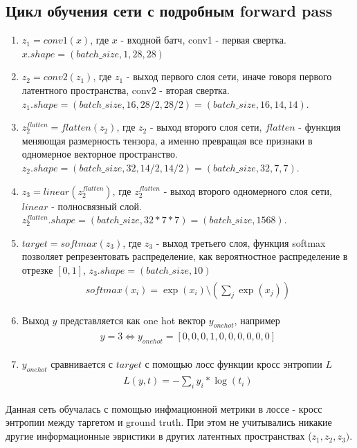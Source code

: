\subsection{Цикл обучения сети с подробным forward pass}
\begin{enumerate}
    \item $z_1 = conv1(x)$, где $x$ - входной батч, conv1 - первая свертка. $x.shape = (batch\_size, 1, 28, 28)$
    \item $z_2 = conv2(z_1)$, где $z_1$ - выход первого слоя сети, иначе говоря первого латентного пространства, conv2 - вторая свертка. $z_1.shape = (batch\_size, 16, 28 / 2, 28 / 2)  = (batch\_size, 16, 14, 14)$.
    \item $z_2^{flatten} = flatten(z_2)$, где $z_2$ - выход второго слоя сети, $flatten$ - функция меняющая размерность тензора, а именно превращая все признаки в одномерное векторное пространство. $z_2.shape = (batch\_size, 32, 14 / 2, 14 / 2) = (batch\_size, 32, 7, 7)$.
    \item $z_3 = linear(z_2^{flatten})$, где $z_2^{flatten}$ - выход второго одномерного слоя сети, $linear$ - полносвязный слой. $z_2^{flatten}.shape = (batch\_size, 32 * 7 * 7) = (batch\_size, 1568)$.
    \item $target = softmax(z_3)$, где $z_3$ - выход третьего слоя, функция softmax позволяет репрезентовать распределение, как вероятностное распределение в отрезке $[0, 1]$, $z_3.shape = (batch\_size, 10)$ 
    \begin{gather}
    \begin{aligned}
    softmax(x_i) = \exp(x_i) \setminus (\sum_{j}\exp(x_j))
    \end{aligned}
    \end{gather}
    \item Выход $y$ представляется как one hot вектор $y_{onehot}$, например 
    \begin{gather}
    \begin{aligned}
    y = 3 \Leftrightarrow y_{onehot} = [0, 0, 0, 1, 0, 0, 0, 0, 0, 0]
    \end{aligned}
    \end{gather}
    \item $y_{onehot}$ сравнивается с $target$ с помощью лосс функции кросс энтропии $L$
    \begin{gather}
    \begin{aligned}
    L(y, t) = - \sum_{i}y_i * \log(t_i)
    \end{aligned}
    \end{gather}
\end{enumerate}
Данная сеть обучалась с помощью инфмационной метрики в лоссе - кросс энтропии между таргетом и ground truth. При этом не учитывались никакие другие информационные эвристики в других латентных пространствах ($z_1, z_2, z_3)$.



